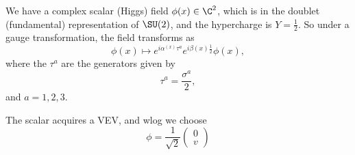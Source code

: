 \documentclass[a4paper]{article}
\begin{document}
We have a complex scalar (Higgs) field $\phi(x) \in \C^2$, which is in the doublet (fundamental) representation of $\SU(2)$, and the hypercharge is $Y = \frac{1}{2}$. So under a gauge transformation, the field transforms as
\[
  \phi(x) \mapsto e^{i \alpha^(x) \tau^a} e^{i \beta(x) \frac{1}{2}} \phi(x),
\]
where the $\tau^a$ are the generators given by
\[
  \tau^a = \frac{\sigma^a}{2},
\]
and $a = 1, 2, 3$.

The scalar acquires a VEV, and wlog we choose
\[
  \phi = \frac{1}{\sqrt{2}}
  \begin{pmatrix}
    0\\ v
  \end{pmatrix}
\]

\printindex
\end{document}
